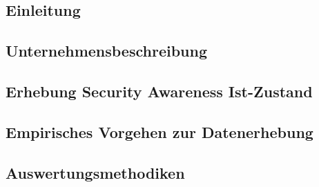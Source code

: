 \documentclass[../../main.tex]{subfiles}
\begin{document}
\subsection{Einleitung}


\subsection{Unternehmensbeschreibung}
\label{unternehmensbeschreibung}


\subsection{Erhebung Security Awareness Ist-Zustand}
\label{erhebung_der_anspruchsgruppen}


\subsection{Empirisches Vorgehen zur Datenerhebung}


\subsection{Auswertungsmethodiken}
\label{Auswertungsmethodiken}

\end{document}

